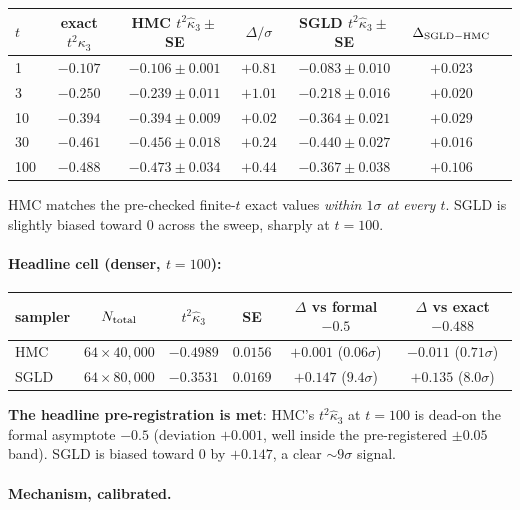 \documentclass[11pt]{article}
\begin{document}
\begin{center}\small
\begin{tabular}{lcccccc}
\toprule
$t$ & exact $t^2 \kappa_3$ &
  HMC $t^2 \hat\kappa_3 \pm$ SE & $\Delta/\sigma$ &
  SGLD $t^2 \hat\kappa_3 \pm$ SE & $\Delta_{\rm SGLD-HMC}$ \\
\midrule
1   & $-0.107$ & $-0.106 \pm 0.001$ & $+0.81$ & $-0.083 \pm 0.010$ & $+0.023$ \\
3   & $-0.250$ & $-0.239 \pm 0.011$ & $+1.01$ & $-0.218 \pm 0.016$ & $+0.020$ \\
10  & $-0.394$ & $-0.394 \pm 0.009$ & $+0.02$ & $-0.364 \pm 0.021$ & $+0.029$ \\
30  & $-0.461$ & $-0.456 \pm 0.018$ & $+0.24$ & $-0.440 \pm 0.027$ & $+0.016$ \\
100 & $-0.488$ & $-0.473 \pm 0.034$ & $+0.44$ & $-0.367 \pm 0.038$ & $+0.106$ \\
\bottomrule
\end{tabular}
\end{center}

HMC matches the pre-checked finite-$t$ exact values \emph{within $1\sigma$
at every $t$}. SGLD is slightly biased toward 0 across the sweep,
sharply at $t = 100$.

\paragraph{Headline cell (denser, $t = 100$):}

\begin{center}\small
\begin{tabular}{lccccc}
\toprule
sampler & $N_{\rm total}$ & $t^2 \hat\kappa_3$ & SE
  & $\Delta$ vs formal $-0.5$ & $\Delta$ vs exact $-0.488$ \\
\midrule
HMC  & $64 \times 40{,}000$ & $-0.4989$ & $0.0156$
  & $+0.001$ ($0.06\sigma$) & $-0.011$ ($0.71\sigma$) \\
SGLD & $64 \times 80{,}000$ & $-0.3531$ & $0.0169$
  & $+0.147$ ($9.4\sigma$) & $+0.135$ ($8.0\sigma$) \\
\bottomrule
\end{tabular}
\end{center}

\textbf{The headline pre-registration is met}: HMC's $t^2 \hat\kappa_3$
at $t = 100$ is dead-on the formal asymptote $-0.5$ (deviation
$+0.001$, well inside the pre-registered $\pm 0.05$ band).
SGLD is biased toward 0 by $+0.147$, a clear $\sim 9\sigma$ signal.

\paragraph{Mechanism, calibrated.}
\end{document}
